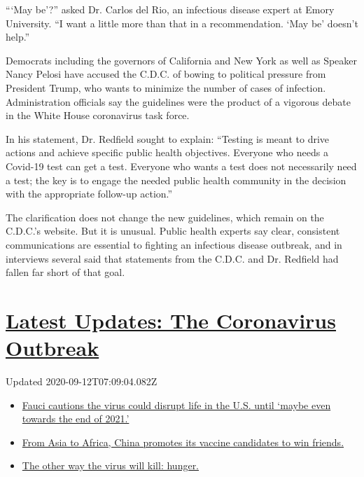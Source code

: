 ```May be'?'' asked Dr. Carlos del Rio, an infectious disease expert at
Emory University. ``I want a little more than that in a recommendation.
`May be' doesn't help.''

Democrats including the governors of California and New York as well as
Speaker Nancy Pelosi have accused the C.D.C. of bowing to political
pressure from President Trump, who wants to minimize the number of cases
of infection. Administration officials say the guidelines were the
product of a vigorous debate in the White House coronavirus task force.

In his statement, Dr. Redfield sought to explain: ``Testing is meant to
drive actions and achieve specific public health objectives. Everyone
who needs a Covid-19 test can get a test. Everyone who wants a test does
not necessarily need a test; the key is to engage the needed public
health community in the decision with the appropriate follow-up
action.''

The clarification does not change the new guidelines, which remain on
the C.D.C.'s website. But it is unusual. Public health experts say
clear, consistent communications are essential to fighting an infectious
disease outbreak, and in interviews several said that statements from
the C.D.C. and Dr. Redfield had fallen far short of that goal.

\hypertarget{latest-updates-the-coronavirus-outbreak}{%
\section{\texorpdfstring{\href{https://www.nytimes3xbfgragh.onion/2020/09/11/world/covid-19-coronavirus.html?action=click\&pgtype=Article\&state=default\&region=MAIN_CONTENT_1\&context=storylines_live_updates}{Latest
Updates: The Coronavirus
Outbreak}}{Latest Updates: The Coronavirus Outbreak}}\label{latest-updates-the-coronavirus-outbreak}}

Updated 2020-09-12T07:09:04.082Z

\begin{itemize}
\tightlist
\item
  \href{https://www.nytimes3xbfgragh.onion/2020/09/11/world/covid-19-coronavirus.html?action=click\&pgtype=Article\&state=default\&region=MAIN_CONTENT_1\&context=storylines_live_updates\#link-dfb8a16}{Fauci
  cautions the virus could disrupt life in the U.S. until `maybe even
  towards the end of 2021.'}
\item
  \href{https://www.nytimes3xbfgragh.onion/2020/09/11/world/covid-19-coronavirus.html?action=click\&pgtype=Article\&state=default\&region=MAIN_CONTENT_1\&context=storylines_live_updates\#link-7104d154}{From
  Asia to Africa, China promotes its vaccine candidates to win friends.}
\item
  \href{https://www.nytimes3xbfgragh.onion/2020/09/11/world/covid-19-coronavirus.html?action=click\&pgtype=Article\&state=default\&region=MAIN_CONTENT_1\&context=storylines_live_updates\#link-393ad215}{The
  other way the virus will kill: hunger.}
\end{itemize}

